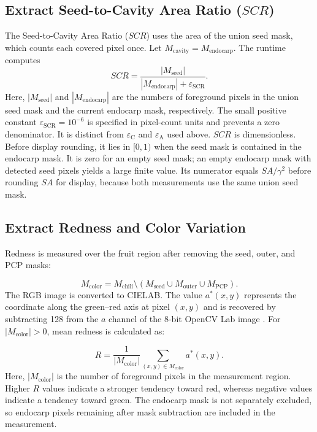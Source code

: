 \documentclass[final,5p,times,twocolumn]{elsarticle}
\begin{document}
\subsection*{Extract Seed-to-Cavity Area Ratio ($SCR$)}
The Seed-to-Cavity Area Ratio ($SCR$) uses the area of the union seed mask, which counts each covered pixel once. Let $M_{\mathrm{cavity}}=M_{\mathrm{endocarp}}$. The runtime computes
\begin{equation}
 SCR=\frac{|M_{\mathrm{seed}}|}{|M_{\mathrm{endocarp}}|+\varepsilon_{\mathrm{SCR}}}.
\end{equation}
Here, $|M_{\mathrm{seed}}|$ and $|M_{\mathrm{endocarp}}|$ are the numbers of foreground pixels in the union seed mask and the current endocarp mask, respectively. The small positive constant $\varepsilon_{\mathrm{SCR}}=10^{-6}$ is specified in pixel-count units and prevents a zero denominator. It is distinct from $\varepsilon_{\mathrm{C}}$ and $\varepsilon_{\mathrm{A}}$ used above. $SCR$ is dimensionless. Before display rounding, it lies in $[0,1)$ when the seed mask is contained in the endocarp mask. It is zero for an empty seed mask; an empty endocarp mask with detected seed pixels yields a large finite value. Its numerator equals $SA/\gamma^2$ before rounding $SA$ for display, because both measurements use the same union seed mask.

\subsection*{Extract Redness and Color Variation}
Redness is measured over the fruit region after removing the seed, outer, and PCP masks:

\begin{equation}
M_{\mathrm{color}}=M_{\mathrm{chili}}\setminus\left(M_{\mathrm{seed}}\cup M_{\mathrm{outer}}\cup M_{\mathrm{PCP}}\right).
\end{equation}
The RGB image is converted to CIELAB. The value $a^*(x,y)$ represents the coordinate along the green--red axis at pixel $(x,y)$ and is recovered by subtracting 128 from the $a$ channel of the 8-bit OpenCV Lab image \cite{cielab}. For $|M_{\mathrm{color}}|>0$, mean redness is calculated as:

\begin{equation}
R=\frac{1}{|M_{\mathrm{color}}|}\sum_{(x,y)\in M_{\mathrm{color}}}a^*(x,y).
\end{equation}
Here, $|M_{\mathrm{color}}|$ is the number of foreground pixels in the measurement region. Higher $R$ values indicate a stronger tendency toward red, whereas negative values indicate a tendency toward green. The endocarp mask is not separately excluded, so endocarp pixels remaining after mask subtraction are included in the measurement.
\end{document}
